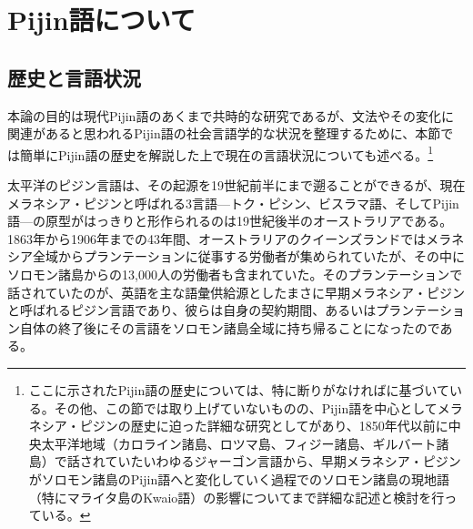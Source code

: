 \section{Pijin語について}
\subsection{歴史と言語状況}
本論の目的は現代Pijin語のあくまで共時的な研究であるが、文法やその変化に関連があると思われるPijin語の社会言語学的な状況を整理するために、本節では簡単にPijin語の歴史を解説した上で現在の言語状況についても述べる。\footnote{
ここに示されたPijin語の歴史については、特に断りがなければ\cite{phonology}に基づいている。その他、この節では取り上げていないものの、Pijin語を中心としてメラネシア・ピジンの歴史に迫った詳細な研究として\cite{keesing}があり、1850年代以前に中央太平洋地域（カロライン諸島、ロツマ島、フィジー諸島、ギルバート諸島）で話されていたいわゆるジャーゴン言語から、早期メラネシア・ピジンがソロモン諸島のPijin語へと変化していく過程でのソロモン諸島の現地語（特にマライタ島のKwaio語）の影響についてまで詳細な記述と検討を行っている。}

太平洋のピジン言語は、その起源を19世紀前半にまで遡ることができる\citep{keesing}が、現在メラネシア・ピジンと呼ばれる3言語---トク・ピシン、ビスラマ語、そしてPijin語---の原型がはっきりと形作られるのは19世紀後半のオーストラリアである。1863年から1906年までの43年間、オーストラリアのクイーンズランドではメラネシア全域からプランテーションに従事する労働者が集められていたが、その中にソロモン諸島からの13,000人の労働者も含まれていた。そのプランテーションで話されていたのが、英語を主な語彙供給源としたまさに早期メラネシア・ピジンと呼ばれるピジン言語であり、彼らは自身の契約期間、あるいはプランテーション自体の終了後にその言語をソロモン諸島全域に持ち帰ることになったのである。

